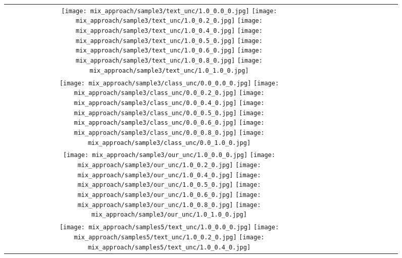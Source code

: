\documentclass[10pt,twocolumn,letterpaper]{article}
\begin{document}
\begin{figure}[tb!]
    \centering
    \setlength{\tabcolsep}{0.5pt}
    {\small
    \renewcommand{\arraystretch}{0.5} 
    \begin{tabular}{c c c c c c c c c c  }
    \captionsetup{type=figure, font=scriptsize}
    \raisebox{0.1in}{\rotatebox{90}{\small \emph{Text
} }}
  \texttt{[image: mix\_approach/sample3/text\_unc/1.0\_0.0\_0.jpg]}
\texttt{[image: mix\_approach/sample3/text\_unc/1.0\_0.2\_0.jpg]}
\texttt{[image: mix\_approach/sample3/text\_unc/1.0\_0.4\_0.jpg]}
\texttt{[image: mix\_approach/sample3/text\_unc/1.0\_0.5\_0.jpg]}
\texttt{[image: mix\_approach/sample3/text\_unc/1.0\_0.6\_0.jpg]}
\texttt{[image: mix\_approach/sample3/text\_unc/1.0\_0.8\_0.jpg]}
\texttt{[image: mix\_approach/sample3/text\_unc/1.0\_1.0\_0.jpg]}
\tabularnewline
    \raisebox{0.1in}{\rotatebox{90}{\small \emph{Class}
}}
  \texttt{[image: mix\_approach/sample3/class\_unc/0.0\_0.0\_0.jpg]}
\texttt{[image: mix\_approach/sample3/class\_unc/0.0\_0.2\_0.jpg]}
\texttt{[image: mix\_approach/sample3/class\_unc/0.0\_0.4\_0.jpg]}
\texttt{[image: mix\_approach/sample3/class\_unc/0.0\_0.5\_0.jpg]}
\texttt{[image: mix\_approach/sample3/class\_unc/0.0\_0.6\_0.jpg]}
\texttt{[image: mix\_approach/sample3/class\_unc/0.0\_0.8\_0.jpg]}
\texttt{[image: mix\_approach/sample3/class\_unc/0.0\_1.0\_0.jpg]}
\tabularnewline
    \raisebox{0.1in}{\rotatebox{90}{\small \emph{Mix
}}}
  \texttt{[image: mix\_approach/sample3/our\_unc/1.0\_0.0\_0.jpg]}
  \texttt{[image: mix\_approach/sample3/our\_unc/1.0\_0.2\_0.jpg]}
  \texttt{[image: mix\_approach/sample3/our\_unc/1.0\_0.4\_0.jpg]}
  \texttt{[image: mix\_approach/sample3/our\_unc/1.0\_0.5\_0.jpg]}
  \texttt{[image: mix\_approach/sample3/our\_unc/1.0\_0.6\_0.jpg]}
  \texttt{[image: mix\_approach/sample3/our\_unc/1.0\_0.8\_0.jpg]}
  \texttt{[image: mix\_approach/sample3/our\_unc/1.0\_1.0\_0.jpg]}
\tabularnewline
    \raisebox{0.1in}{\rotatebox{90}{\small \emph{Text
} }}
  \texttt{[image: mix\_approach/samples5/text\_unc/1.0\_0.0\_0.jpg]}
\texttt{[image: mix\_approach/samples5/text\_unc/1.0\_0.2\_0.jpg]}
\texttt{[image: mix\_approach/samples5/text\_unc/1.0\_0.4\_0.jpg]}

\end{tabular}}
\end{figure}
\end{document}
